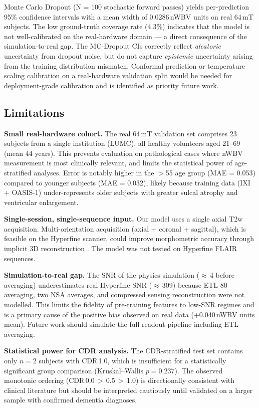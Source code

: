 Monte Carlo Dropout (N = 100 stochastic forward passes) yields
per-prediction 95\% confidence intervals with a mean width of
0.0286\,nWBV units on real 64\,mT subjects. The low ground-truth
coverage rate (4.3\%) indicates that the model is not well-calibrated
on the real-hardware domain — a direct consequence of the
simulation-to-real gap. The MC-Dropout CIs correctly reflect
\emph{aleatoric} uncertainty from dropout noise, but do not capture
\emph{epistemic} uncertainty arising from the training distribution
mismatch. Conformal prediction \cite{angelopoulos2023} or
temperature scaling calibration on a real-hardware validation split
would be needed for deployment-grade calibration and is identified
as priority future work.

\subsection{Limitations}
\label{sec:limitations}

\textbf{Small real-hardware cohort.}
The real 64\,mT validation set comprises 23 subjects from a single
institution (LUMC), all healthy volunteers aged 21--69 (mean 44 years).
This prevents evaluation on pathological cases where nWBV measurement
is most clinically relevant, and limits the statistical power of
age-stratified analyses. Error is notably higher in the $>$55 age
group (MAE = 0.053) compared to younger subjects (MAE = 0.032),
likely because training data (IXI + OASIS-1) under-represents
older subjects with greater sulcal atrophy and ventricular enlargement.

\textbf{Single-session, single-sequence input.}
Our model uses a single axial T2w acquisition. Multi-orientation
acquisition (axial + coronal + sagittal), which is feasible on the
Hyperfine scanner, could improve morphometric accuracy through
implicit 3D reconstruction \cite{iglesias2023}. The model was
not tested on Hyperfine FLAIR sequences.

\textbf{Simulation-to-real gap.}
The SNR of the physics simulation ($\approx$\,4 before averaging)
underestimates real Hyperfine SNR ($\approx$\,309) because
ETL-80 averaging, two NSA averages, and compressed sensing
reconstruction were not modelled. This limits the fidelity of
pre-training features to low-SNR regimes and is a primary cause
of the positive bias observed on real data (+0.040\,nWBV units mean).
Future work should simulate the full readout pipeline including
ETL averaging.

\textbf{Statistical power for CDR analysis.}
The CDR-stratified test set contains only $n = 2$ subjects with
CDR\,1.0, which is insufficient for a statistically significant
group comparison (Kruskal--Wallis $p = 0.237$). The observed
monotonic ordering (CDR\,0.0\,$>$\,0.5\,$>$\,1.0) is directionally
consistent with clinical literature but should be interpreted
cautiously until validated on a larger sample with confirmed dementia
diagnoses.

